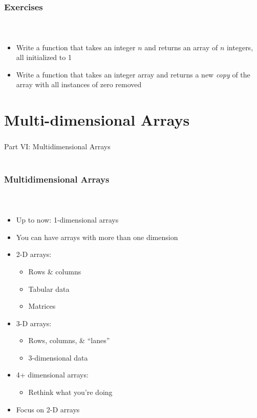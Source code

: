 \documentclass[]{beamer}
\begin{document}
\begin{frame}[fragile]
    \frametitle{Exercises}
    \framesubtitle{~}

\begin{itemize}
  \item Write a function that takes an integer $n$ and returns
  an array of $n$ integers, all initialized to 1
  \item Write a function that takes an integer array and returns a new
  \emph{copy} of the array with all instances of zero removed 
\end{itemize}
  
\end{frame}

\section{Multi-dimensional Arrays}

\begin{frame}
    \frametitle{}
    \framesubtitle{}
    
    \begin{center}
    {\Huge Part VI: Multidimensional Arrays}\\
    {\Large ~}
    \end{center}

\end{frame}

\begin{frame}[fragile]
    \frametitle{Multidimensional Arrays}
    \framesubtitle{~}

\begin{itemize}[<+->]  
  \item Up to now: 1-dimensional arrays
  \item You can have arrays with more than one dimension
  \item 2-D arrays: 
  \begin{itemize}
    \item Rows \& columns
    \item Tabular data
    \item Matrices
  \end{itemize}
  \item 3-D arrays:
  \begin{itemize}
    \item Rows, columns, \& ``lanes'' 
    \item 3-dimensional data
  \end{itemize}
  \item 4+ dimensional arrays:
  \begin{itemize}
    \item Rethink what you're doing
  \end{itemize}
  \item Focus on 2-D arrays
\end{itemize}

\end{frame}
\end{document}
